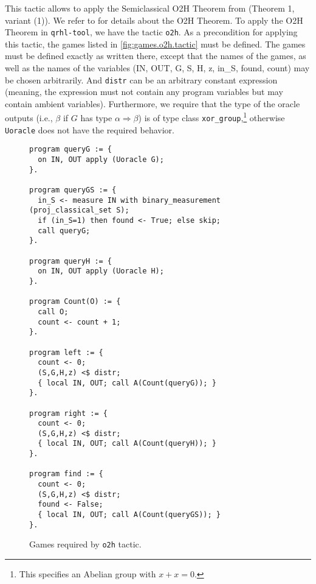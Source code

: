 \documentclass{article}
\begin{document}
This tactic allows to apply the Semiclassical O2H Theorem from
\cite{ambainis19semiclassical} (Theorem 1, variant (1)).  We refer to
\cite{ambainis19semiclassical} for details about the O2H Theorem.  To
apply the O2H Theorem in \texttt{qrhl-tool}, we have the tactic
\texttt{o2h}. As a precondition for applying this tactic, the games
listed in \autoref{fig:games.o2h.tactic} must be defined. The games
must be defined exactly as written there, except that the names of the
games, as well as the names of the variables (IN, OUT, G, S, H, z,
in\_S, found, count) may be chosen arbitrarily. And \texttt{distr} can
be an arbitrary constant expression (meaning, the expression must not
contain any program variables but may contain ambient variables).
Furthermore, we require that the type of the oracle outputs (i.e.,
$\beta$ if $G$ has type $\alpha\Rightarrow\beta$) is of type class
\texttt{xor\_group},\footnote{This specifies
  an Abelian group with $x+x=0$.} otherwise \texttt{Uoracle} does not have the required behavior.
%
\begin{figure}[t]
  {\smaller\smaller  \lstset{language=qrhl}
\begin{lstlisting}
program queryG := {
  on IN, OUT apply (Uoracle G);
}.

program queryGS := {
  in_S <- measure IN with binary_measurement (proj_classical_set S);
  if (in_S=1) then found <- True; else skip;
  call queryG;
}.

program queryH := {
  on IN, OUT apply (Uoracle H);
}.

program Count(O) := {
  call O;
  count <- count + 1;
}.

program left := {
  count <- 0;
  (S,G,H,z) <$ distr;
  { local IN, OUT; call A(Count(queryG)); }
}.

program right := {
  count <- 0;
  (S,G,H,z) <$ distr;
  { local IN, OUT; call A(Count(queryH)); }
}.

program find := {
  count <- 0;
  (S,G,H,z) <$ distr;
  found <- False;
  { local IN, OUT; call A(Count(queryGS)); }
}.
\end{lstlisting}
  }
  \caption[Games required by o2h tactic.]{\label{fig:games.o2h.tactic}Games required by \texttt{o2h} tactic.}
\end{figure}
%
\end{document}
